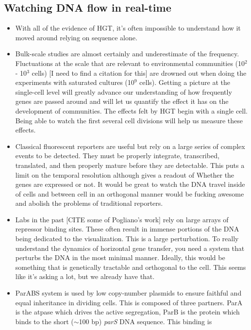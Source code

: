 \subsection*{Watching DNA flow in real-time}
\begin{itemize}
	\item With all of the evidence of HGT, it's often impossible to
		understand how it moved around relying on sequence alone. 
	\item Bulk-scale studies are almost certainly and underestimate of the
		frequency. Fluctuations at the scale that are relevant to
		environmental communities  (10$^2$ - 10$^3$ cells) [I need to
		find a citation for this] are drowned out when doing the
		experiments with saturated cultures (10$^9$ cells). Getting a
		picture at the single-cell level will greatly advance our
		understanding of how frequently genes are passed around and will
		let us quantify the effect it has on the development of
		communities. The effects felt by HGT begin with a single cell.
		Being able to watch the first several cell divisions will help
		us measure these effects.
	\item Classical fluorescent reporters are useful but rely on a large
		series of complex events to be detected. They must be properly
		integrate, transcribed, translated, and then properly mature
		before they are detectable. This puts a limit on the temporal
		resolution although gives a readout of Whether the genes are
		expressed or not. It would be great to watch the DNA travel
		inside of cells and between cell in an orthogonal manner would
		be fucking awesome and abolish the problems of traditional reporters. 
	\item Labs in the past [CITE some of Pogliano's work] rely on large
		arrays of repressor binding sites. These often result in immense
		portions of the DNA being dedicated to the visualization. This
		is a large perturbation. To really understand the dynamics of
		horizontal gene transfer, you need a system that perturbs the
		DNA in the most minimal manner. Ideally, this would be something
		that is genetically tractable and orthogonal to the cell. This
		seems like it's asking a lot, but we already have that. 
	\item ParABS system is used by low copy-number plasmids to ensure
		faithful and equal inheritance in dividing cells. This is
		composed of three partners. ParA is the atpase which drives the
		active segregation, ParB is the protein which binds to the short
		($\sim$100 bp) \textit{parS} DNA sequence. This binding is

\end{itemize}
